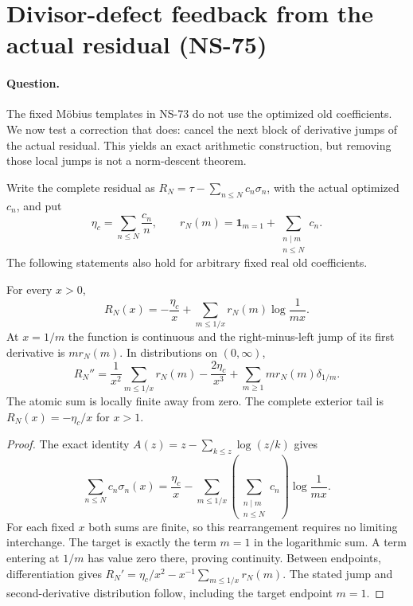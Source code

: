 \section{Divisor-defect feedback from the actual residual (NS-75)}
\label{sec:ns75-divisor-feedback}

\paragraph{Question.}
The fixed M\"obius templates in NS-73 do not use the optimized old
coefficients. We now test a correction that does: cancel the next block
of derivative jumps of the actual residual. This yields an exact
arithmetic construction, but removing those local jumps is not a
norm-descent theorem.

Write the complete residual as
$R_N=\tau-\sum_{n\leq N}c_n\sigma_n$, with the actual optimized $c_n$,
and put
\[
 \eta_c=\sum_{n\leq N}\frac{c_n}{n},\qquad
 r_N(m)=\mathbf1_{m=1}+\sum_{\substack{n\mid m\\n\leq N}}c_n.
\]
The following statements also hold for arbitrary fixed real old coefficients.

\begin{proposition}
\label{prop:ns75-divisor-cells}
For every $x>0$,
\begin{equation}
 R_N(x)=-\frac{\eta_c}{x}
       +\sum_{m\leq1/x}r_N(m)\log\frac1{mx}.
 \label{eq:ns75-divisor-cells}
\end{equation}
At $x=1/m$ the function is continuous and the right-minus-left jump of
its first derivative is $m r_N(m)$. In distributions on $(0,\infty)$,
\begin{equation}
 R_N''=\frac1{x^2}\sum_{m\leq1/x}r_N(m)
           -\frac{2\eta_c}{x^3}
           +\sum_{m\geq1}m r_N(m)\delta_{1/m}.
 \label{eq:ns75-jump-measure}
\end{equation}
The atomic sum is locally finite away from zero. The complete exterior
tail is $R_N(x)=-\eta_c/x$ for $x>1$.
\end{proposition}
\begin{proof}
The exact identity
$A(z)=z-\sum_{k\leq z}\log(z/k)$ gives
\[
 \sum_{n\leq N}c_n\sigma_n(x)
 =\frac{\eta_c}{x}-\sum_{m\leq1/x}
       \left(\sum_{\substack{n\mid m\\n\leq N}}c_n\right)
       \log\frac1{mx}.
\]
For each fixed $x$ both sums are finite, so this rearrangement requires
no limiting interchange. The target is exactly the term $m=1$ in the
logarithmic sum. A term entering at $1/m$ has value zero there, proving
continuity. Between endpoints, differentiation gives
$R_N'=\eta_c/x^2-x^{-1}\sum_{m\leq1/x}r_N(m)$.
The stated jump and second-derivative distribution follow, including
the target endpoint $m=1$.
\end{proof}

